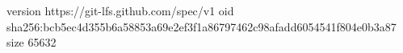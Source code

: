 version https://git-lfs.github.com/spec/v1
oid sha256:bcb5ec4d355b6a58853a69e2ef3f1a86797462c98afadd6054541f804e0b3a87
size 65632
